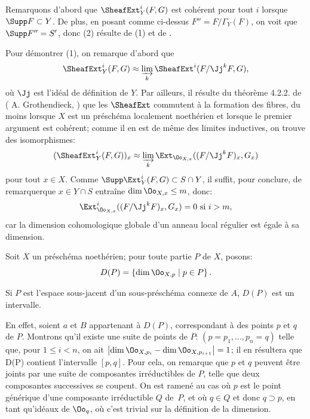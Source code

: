 Remarquons d'abord que $\SheafExt^i_Y (F, G)$ est coh\'erent pour tout $i$ lorsque $\Supp F \subset Y$. De plus, en posant comme ci-dessus $F'' = F/\Gamma_Y(F)$, on voit que $\Supp F'' = S'$, donc (2) r\'esulte de (1) et de .

Pour d\'emontrer (1), on remarque d'abord que
\[
\SheafExt^i_Y (F, G) \approx \varinjlim_{k} \SheafExt^i (F/\Jj^k F, G),
\]
o\`u $\Jj$ est l'id\'eal de d\'efinition de $Y$. Par ailleurs, il
r\'esulte du th\'eor\`eme 4.2.2. de ( A. Grothendieck,
) que les $\SheafExt$ commutent \`a
la formation des fibres, du moins lorsque $X$ est un pr\'esch\'ema
localement noeth\'erien et lorsque le premier argument est coh\'erent;
comme il en est de m\^eme des limites inductives, on trouve des
isomorphismes:
\[
(\SheafExt^i_Y (F, G))_x \approx \varinjlim_{k} \Ext_{\Oo_{X, x}} ((F/\Jj^k F)_x, G_x)
\]
pour tout $x \in X$. Comme $\Supp \Ext^i_Y (F, G) \subset S \cap Y$, il suffit, pour conclure, de remarquer\pageoriginale que $x \in Y \cap S$ entra\^ine $\dim \Oo_{X, x} \leq m$, donc:
\[
\Ext^i_{\Oo_{X, x}} ((F/\Jj^k F)_x, G_x) = 0 \text { si } i > m,
\]
car la dimension cohomologique globale d'un anneau local r\'egulier est \'egale \`a sa dimension.

Soit $X$ un pr\'esch\'ema  noeth\'erien; pour toute partie $P$ de $X$, posons:
\[
D(P) = \left\{ \dim \Oo_{X, p} \mid p \in P \right\}.
\]

\begin{lemme}\label{VII.2.2}
Si $P$ est l'espace sous-jacent d'un sous-pr\'esch\'ema connexe de $A$, $D(P)$ est un intervalle.
\end{lemme}

En effet, soient $a$ et $B$ appartenant \`a $D(P)$, correspondant \`a des points $p$ et $q$ de $P$. Montrons qu'il existe une suite de points de $P$: $(p = p_1, \dots, p_n = q)$ telle que, pour $1 \leq i < n $, on ait $\left| \dim \Oo_{X, p_i} - \dim \Oo_{X, p_{i+1}} \right| = 1$; il en r\'esultera que D(P) contient l'intervalle $[p, q]$. Pour cela, on remarque que $p$ et $q$ peuvent \^etre joints par une suite de composantes irr\'eductibles de $P$, telle que deux composantes successives se coupent. On est ramen\'e au cas o\`u $p$ est le point g\'en\'erique d'une composante irr\'eductible $Q$ de~$P$, et o\`u $q \in Q$ et donc $q \supset p$, en tant qu'id\'eaux de $\Oo_q$, o\`u c'est trivial sur la d\'efinition de la dimension.

